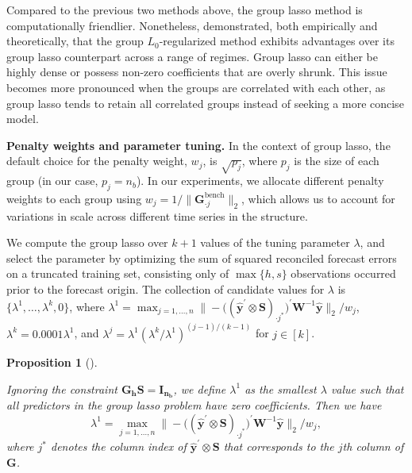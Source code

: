\documentclass[
  11pt]{article}
\theoremstyle{plain}
\newtheorem{proposition}{Proposition}[section]
\theoremstyle{remark}
\begin{document}
Compared to the previous two methods above, the group lasso method is
computationally friendlier. Nonetheless, \citet{Hazimeh2023-ie}
demonstrated, both empirically and theoretically, that the group
\(L_0\)-regularized method exhibits advantages over its group lasso
counterpart across a range of regimes. Group lasso can either be highly
dense or possess non-zero coefficients that are overly shrunk. This
issue becomes more pronounced when the groups are correlated with each
other, as group lasso tends to retain all correlated groups instead of
seeking a more concise model.

\textbf{Penalty weights and parameter tuning.} In the context of group
lasso, the default choice for the penalty weight, \(w_j\), is
\(\sqrt{p_j}\), where \(p_j\) is the size of each group (in our case,
\(p_j = n_b\)). In our experiments, we allocate different penalty
weights to each group using
\(w_j = 1/\|\bm{G}_{\cdot j}^{\text{bench}}\|_2\), which allows us to
account for variations in scale across different time series in the
structure.

We compute the group lasso over \(k+1\) values of the tuning parameter
\(\lambda\), and select the parameter by optimizing the sum of squared
reconciled forecast errors on a truncated training set, consisting only
of \(\max\{h, s\}\) observations occurred prior to the forecast origin.
The collection of candidate values for \(\lambda\) is
\(\{\lambda^{1},\dots,\lambda^{k}, 0\}\), where
\(\lambda^{1} = \max_{j=1, \ldots, n}\big\|-\big((\hat{\bm{y}}^{\prime} \otimes \bm{S})_{\cdot j^{*}}\big)^{\prime} \bm{W}^{-1} \hat{\bm{y}}\big\|_2 / w_j\),
\(\lambda^{k} = 0.0001\lambda^{1}\), and
\(\lambda^{j} = \lambda^{1}(\lambda^{k} / \lambda^{1})^{(j-1) / (k-1)}\)
for \(j \in [k]\).

\begin{proposition}[]\protect\hypertarget{prp-3}{}\label{prp-3}

Ignoring the constraint \(\bm{G_h S}=\bm{I_{n_b}}\), we define
\(\lambda^{1}\) as the smallest \(\lambda\) value such that all
predictors in the group lasso problem have zero coefficients. Then we
have \[
\lambda^{1} = \max_{j=1, \ldots, n}\big\|-\big((\hat{\bm{y}}^{\prime} \otimes \bm{S})_{\cdot j^{*}}\big)^{\prime} \bm{W}^{-1} \hat{\bm{y}}\big\|_2 / w_j,
\] where \(j^{*}\) denotes the column index of
\(\hat{\bm{y}}^{\prime} \otimes \bm{S}\) that corresponds to the \(j\)th
column of \(\bm{G}\).

\end{proposition}
\end{document}
